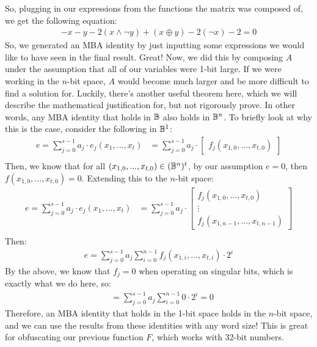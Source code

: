 So, plugging in our expressions from the functions the matrix was composed of,
we get the following equation:
\begin{align*}
    - x - y - 2(x \land \neg y) + (x \oplus y) - 2(\neg x) - 2 = 0
\end{align*}
So, we generated an MBA identity by just inputting some expressions we would like to
have seen in the final result. Great! Now, we did this by composing $A$ under the
assumption that all of our variables were 1-bit large. If we were working in the $n$-bit
space, $A$ would become much larger and be more difficult to find a solution for.
Luckily, there's another useful theorem here, which
we will describe the mathematical justification for, but not rigorously prove.
In other words, any MBA identity that holds in $\mathbb{B}$ also holds in $\mathbb{B}^n$.
To briefly look at why this is the case, consider the following in $\mathbb{B}^1$:
\begin{align*}
    e = \sum_{j=0}^{s-1}a_j \cdot e_j(x_1, ..., x_t) &= \sum_{j=0}^{s-1} a_j \cdot \begin{bmatrix}
    f_j(x_{1, 0}, ..., x_{t, 0})
    \end{bmatrix}\\
\end{align*}
Then, we know that for all $(x_{1,0}, ..., x_{t,0}) \in (\mathbb{B}^n)^t$, by our assumption $e = 0$,
then $f(x_{1,0}, ..., x_{t, 0}) = 0$. Extending this to the $n$-bit space:
\begin{align*}
    e = \sum_{j=0}^{s-1}a_j \cdot e_j(x_1, ..., x_t) &= \sum_{j=0}^{s-1} a_j \cdot \begin{bmatrix}
    f_j(x_{1,0}, ..., x_{t, 0})\\
    \vdots \\
    f_j(x_{1,n-1}, ..., x_{t, n-1})
    \end{bmatrix}\\
\end{align*}
Then:
\begin{align*}
    e =  \sum_{j=0}^{s-1} a_j \sum_{i=0}^{n-1} f_j(x_{1,i}, ..., x_{t, i}) \cdot 2^{i}
\end{align*}
By the above, we know that $f_j = 0$ when operating on singular bits, which is
exactly what
we do here, so:
\begin{align*}
    &= \sum_{j=0}^{s-1} a_j \sum_{i=0}^{n-1} 0 \cdot 2^{i} = 0
\end{align*}
Therefore, an MBA identity that holds in the 1-bit space holds in the $n$-bit space,
and we can use the results from these identities with any word size! This is
great for obfuscating our previous function $F$, which works with 32-bit numbers.
